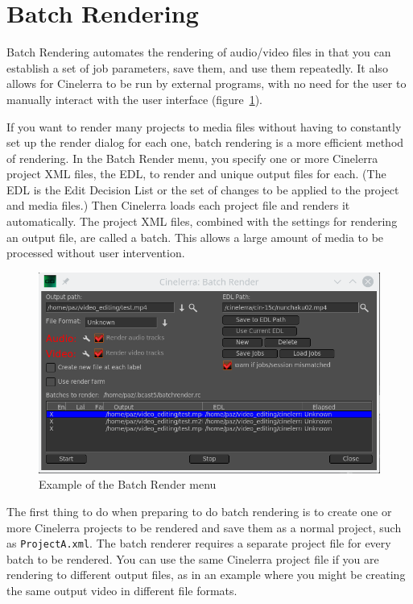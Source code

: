 \section{Batch Rendering}%
\label{sec:batch_rendering}

Batch Rendering automates the rendering of audio/video files in that you can establish a set of job parameters, save them, and use them repeatedly.  It also allows for Cinelerra to be run by external programs, with no need for the user to manually interact with the user interface (figure~\ref{fig:batch01}).

If you want to render many projects to media files without having to constantly set up the render dialog for each one, batch rendering is a more efficient method of rendering.  In the Batch Render menu, you specify one or more Cinelerra project XML files, the EDL, to render and unique output files for each. (The EDL is the Edit Decision List or the set of changes to be applied to the project and media files.) Then Cinelerra loads each project file and renders it automatically. The project XML files, combined with the settings for rendering an output file, are called a batch.  This allows a large amount of media to be processed without user intervention.

\begin{figure}[htpb]
    \centering
    \includegraphics[width=0.8\linewidth]{images/batch01.png}
    \caption{Example of the Batch Render menu}
    \label{fig:batch01}
\end{figure}

The first thing to do when preparing to do batch rendering is to create one or more Cinelerra projects to be rendered and save them as a normal project, such as \texttt{ProjectA.xml}.  The batch renderer requires a separate project file for every batch to be rendered.  You can use the same Cinelerra project file if you are rendering to different output files, as in an example where you might be creating the same output video in different file formats.

